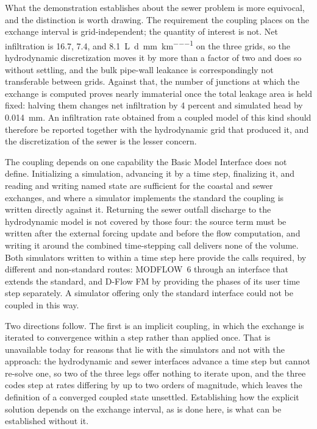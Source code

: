 \documentclass[preprint,authoryear,11pt]{elsarticle}
\begin{document}
What the demonstration establishes about the sewer problem is more equivocal, and the distinction is worth drawing. The requirement the coupling places on the exchange interval is grid-independent; the quantity of interest is not. Net infiltration is 16.7, 7.4, and \SI{8.1}{\liter\per\day\per\milli\meter\per\kilo\meter} on the three grids, so the hydrodynamic discretization moves it by more than a factor of two and does so without settling, and the bulk pipe-wall leakance is correspondingly not transferable between grids. Against that, the number of junctions at which the exchange is computed proves nearly immaterial once the total leakage area is held fixed: halving them changes net infiltration by 4 percent and simulated head by \SI{0.014}{\milli\meter}. An infiltration rate obtained from a coupled model of this kind should therefore be reported together with the hydrodynamic grid that produced it, and the discretization of the sewer is the lesser concern.

The coupling depends on one capability the Basic Model Interface does not define. Initializing a simulation, advancing it by a time step, finalizing it, and reading and writing named state are sufficient for the coastal and sewer exchanges, and where a simulator implements the standard the coupling is written directly against it. Returning the sewer outfall discharge to the hydrodynamic model is not covered by those four: the source term must be written after the external forcing update and before the flow computation, and writing it around the combined time-stepping call delivers none of the volume. Both simulators written to within a time step here provide the calls required, by different and non-standard routes: MODFLOW~6 through an interface that extends the standard, and D-Flow FM by providing the phases of its user time step separately. A simulator offering only the standard interface could not be coupled in this way.

Two directions follow. The first is an implicit coupling, in which the exchange is iterated to convergence within a step rather than applied once. That is unavailable today for reasons that lie with the simulators and not with the approach: the hydrodynamic and sewer interfaces advance a time step but cannot re-solve one, so two of the three legs offer nothing to iterate upon, and the three codes step at rates differing by up to two orders of magnitude, which leaves the definition of a converged coupled state unsettled. Establishing how the explicit solution depends on the exchange interval, as is done here, is what can be established without it.
\end{document}
